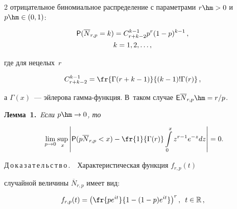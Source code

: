 \begin{multicols}{2}
отрицательное биномиальное распределение с параметрами $r\hm>0$ и~$p\hm\in(0,1)$:


\begin{multline}


{\sf P}(\overline N_{r,p}=k)=C_{r+k-2}^{k-1}p^r(1-p)^{k-1}\,,\\


k=1,2,\ldots,\label{e11-kk}


\end{multline}


где для нецелых~$r$


$$


C_{r+k-2}^{k-1}=\fr{\Gamma(r+k-1)}{(k-1)!\Gamma(r)}\,,


$$


а $\Gamma(x)$~--- эйлерова гам\-ма-функ\-ция. В~таком случае ${\sf


E}\overline N_{r,p}\hm=r/p$.





\smallskip





\noindent


\textbf{Лемма~1.}\ \textit{Eсли $p\hm\to0$, то}


\begin{equation}


\hspace*{-1mm}\lim\limits_{p\to 0}\sup\limits_x\left\vert {\sf P}(p\overline


N_{r,p}<x)-\fr{1}{\Gamma(r)}\int\limits_{0}^{x}z^{r-1}e^{-z}dz\right\vert =0.\!\!\!\!


\label{e12-kk}


\end{equation}





\smallskip





\noindent


Д\,о\,к\,а\,з\,а\,т\,е\,л\,ь\,с\,т\,в\,о\,.\ \ Характеристическая функция $f_{r,p}(t)$


случайной величины $\overline N_{r,p}$ имеет вид:


$$


f_{r,p}(t)=\left(\fr{pe^{it}}{1-(1-p)e^{it}}\right)^r,\enskip


t\in\mathbb{R}\,,


$$



\end{multicols}
